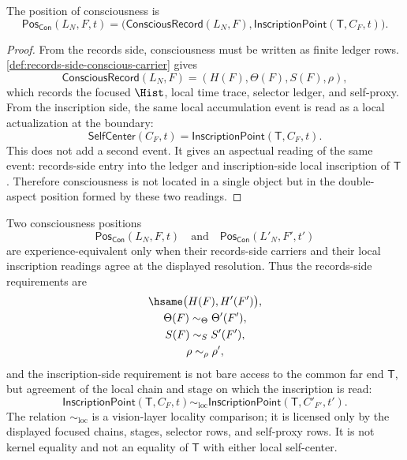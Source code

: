 \begin{theorem}
\label{thm:consciousness-double-aspect-position}
The position of consciousness is
$$
\mathsf{Pos}_{\mathsf{Con}}(L_N,F,t)
=
\bigl(
\mathsf{ConsciousRecord}(L_N,F),
\mathsf{InscriptionPoint}(\mathsf{T},C_F,t)
\bigr).
$$
\end{theorem}

\begin{proof}
From the records side, consciousness must be written as finite ledger rows.
\autoref{def:records-side-conscious-carrier} gives
$$
\mathsf{ConsciousRecord}(L_N,F)
=
(H(F),\Theta(F),S(F),\rho),
$$
which records the focused $\Hist$, local time trace, selector ledger, and
self-proxy. From the inscription side, the same local accumulation event is
read as a local actualization at the boundary:
$$
\mathsf{SelfCenter}(C_F,t)
=
\mathsf{InscriptionPoint}(\mathsf{T},C_F,t).
$$
This does not add a second event. It gives an aspectual reading of the same
event: records-side entry into the ledger and inscription-side local
inscription of $\mathsf{T}$. Therefore consciousness is not located in a
single object but in the double-aspect position formed by these two
readings.
\end{proof}

\begin{definition}
\label{def:experience-position-equivalence}
Two consciousness positions
$$
\mathsf{Pos}_{\mathsf{Con}}(L_N,F,t)
\quad\text{and}\quad
\mathsf{Pos}_{\mathsf{Con}}(L'_N,F',t')
$$
are experience-equivalent only when their records-side carriers and their
local inscription readings agree at the displayed resolution. Thus the
records-side requirements are
$$
\begin{gathered}
\hsame\bigl(H(F),H'(F')\bigr),\\
\Theta(F)\sim_{\Theta}\Theta'(F'),\\
S(F)\sim_S S'(F'),\\
\rho\sim_{\rho}\rho',
\end{gathered}
$$
and the inscription-side requirement is not bare access to the common far
end $\mathsf{T}$, but agreement of the local chain and stage on which the
inscription is read:
$$
\mathsf{InscriptionPoint}(\mathsf{T},C_F,t)
\sim_{\mathrm{loc}}
\mathsf{InscriptionPoint}(\mathsf{T},C'_{F'},t').
$$
The relation $\sim_{\mathrm{loc}}$ is a vision-layer locality comparison;
it is licensed only by the displayed focused chains, stages, selector
rows, and self-proxy rows. It is not kernel equality and not an equality
of $\mathsf{T}$ with either local self-center.
\end{definition}

